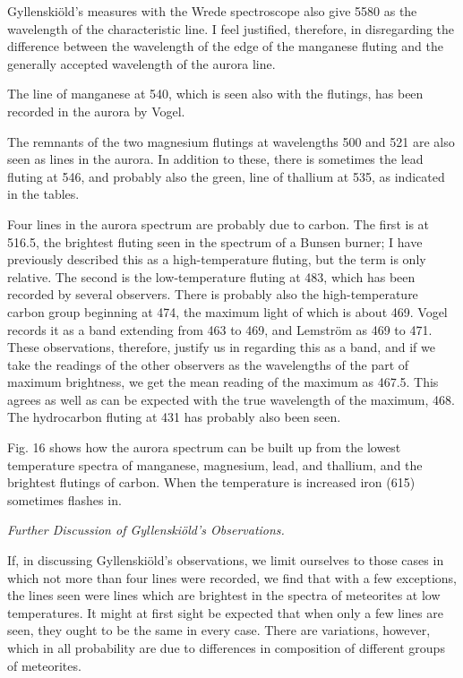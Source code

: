 \documentclass[a4paper, 12pt, oneside, polutonikogreek, english]{article}
\begin{document}
Gyllenskiöld's measures with the Wrede spectroscope also give 5580 as the wavelength of the characteristic line. I feel justified, therefore, in disregarding the difference between the wavelength of the edge of the manganese fluting and the generally accepted wavelength of the aurora line.

The line of manganese at 540, which is seen also with the flutings, has been recorded in the aurora by Vogel.

The remnants of the two magnesium flutings at wavelengths 500 and 521 are also seen as lines in the aurora. In addition to these, there is sometimes the lead fluting at 546, and probably also the green, line of thallium at 535, as indicated in the tables.

Four lines in the aurora spectrum are probably due to carbon. The first is at 516.5, the brightest fluting seen in the spectrum of a Bunsen burner; I have previously described this as a high-temperature fluting, but the term is only relative. The second is the low-temperature fluting at 483, which has been recorded by several observers. There is probably also the high-temperature carbon group beginning at 474, the maximum light of which is about 469. Vogel records it as a band extending from 463 to 469, and Lemström as 469 to 471. These observations, therefore, justify us in regarding this as a band, and if we take the readings of the other observers as the wavelengths of the part of maximum brightness, we get the mean reading of the maximum as 467.5. This agrees as well as can be expected with the true wavelength of the maximum, 468. The hydrocarbon fluting at 431 has probably also been seen.

Fig. 16 shows how the aurora spectrum can be built up from the lowest temperature spectra of manganese, magnesium, lead, and thallium, and the brightest flutings of carbon. When the temperature is increased iron (615) sometimes flashes in.

\emph{Further Discussion of Gyllenskiöld's Observations.}

If, in discussing Gyllenskiöld's observations, we limit ourselves to those cases in which not more than four lines were recorded, we find that with a few exceptions, the lines seen were lines which are brightest in the spectra of meteorites at low temperatures. It might at first sight be expected that when only a few lines are seen, they ought to be the same in every case. There are variations, however, which in all probability are due to differences in composition of different groups of meteorites.
\end{document}
